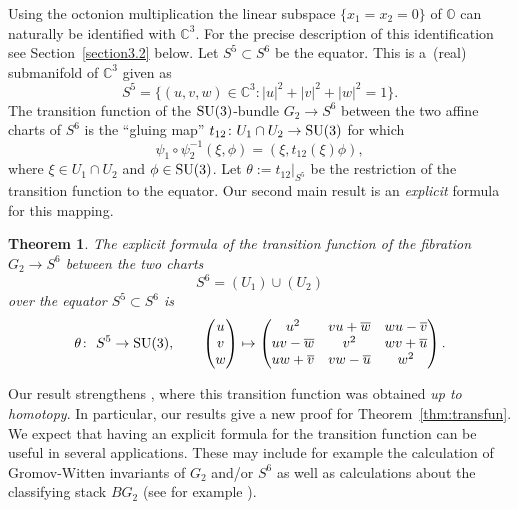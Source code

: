 \documentclass[10pt,a4paper]{amsart}
\numberwithin{equation}{section}
\newtheorem{Theorem}{Theorem}[section]
\begin{document}
Using the octonion multiplication the linear subspace $\{x_1=x_2=0\}$ of $\mathbb{O}$ can naturally be identified with $\mathbb{C}^3$. For the precise description of this identification see Section~\ref{section3.2} below. Let $S^5 \subset S^6$ be the equator. This is a~(real) submanifold of $\mathbb{C}^3$ given as
\[ S^5=\big\{(u,v,w) \in \mathbb{C}^3 \colon |u|^2+|v|^2+|w|^2=1 \big\}.\]
The transition function of the ${\rm SU}(3)$-bundle $G_2 \rightarrow S^6$ between the two affine charts of $S^6$ is the ``gluing map'' $t_{12}\colon U_1 \cap U_2 \to {\rm SU}(3)$ for which
\[ \psi_1 \circ \psi_2^{-1}(\xi,\phi)=(\xi, t_{12}(\xi)\phi),\]
where $\xi \in U_1 \cap U_2$ and $\phi \in {\rm SU}(3)$.
Let $\theta:=t_{12}|_{S^5}$ be the restriction of the transition function to the equator. Our second main result is an \emph{explicit} formula for this mapping.
\begin{Theorem} \label{thm:trans}
 The explicit formula of the transition function of the fibration $G_2 \rightarrow S^6$ between the two charts
 \[S^6= ( U_1 ) \cup ( U_2 ) \]
 over the equator $S^5 \subset S^6$ is
 \begin{gather*}
 \theta\colon \ S^5 \rightarrow {\rm SU}(3), \qquad
 \begin{pmatrix}
 u\\ v\\ w
 \end{pmatrix}\mapsto
 \begin{pmatrix}
 u^2 & vu +\overline{w} &wu-\overline{v}\\
 uv-\overline{w} & v^2 & wv+\overline{u} \\
 uw+\overline{v}& vw-\overline{u} & w^2
 \end{pmatrix}.
 \end{gather*}
\end{Theorem}

Our result strengthens \cite[Corollary~3]{chaves96complex}, where this transition function was obtained \emph{up to homotopy}. In particular, our results give a new proof for Theorem~\ref{thm:transfun}. We expect that having an explicit formula for the transition function can be useful in several applications. These may include for example the calculation of Gromov-Witten invariants of $G_2$ and/or $S^6$ as well as calculations about the classifying stack $BG_2$ (see for example \cite[Section~3.2]{pirisi2017motivic}).
\end{document}
